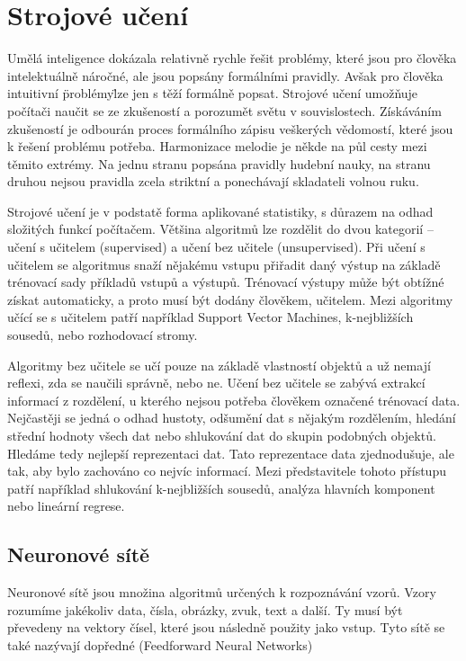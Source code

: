 \chapter{Strojové učení}
Umělá inteligence dokázala relativně rychle řešit problémy, 
které jsou pro člověka intelektuálně náročné, 
ale jsou popsány formálními pravidly.
Avšak pro člověka intuitivní \"problémy\" lze jen s těží formálně popsat.
Strojové učení umožňuje počítači naučit se ze zkušeností
a porozumět světu v souvislostech.
Získáváním zkušeností je odbourán proces formálního zápisu veškerých vědomostí,
které jsou k řešení problému potřeba.\cite{Goodfellow-et-al-2016}
Harmonizace melodie je někde na půl cesty mezi těmito extrémy.
Na jednu stranu popsána pravidly hudební nauky,
na stranu druhou nejsou pravidla zcela striktní 
a ponechávají skladateli volnou ruku.
\par

Strojové učení je v podstatě forma aplikované statistiky,
s důrazem na odhad složitých funkcí počítačem.
Většina algoritmů lze rozdělit do dvou kategorií -- učení s učitelem (supervised) 
a učení bez učitele (unsupervised).
Při učení s učitelem se algoritmus snaží nějakému vstupu přiřadit daný výstup
na základě trénovací sady příkladů vstupů a výstupů.
Trénovací výstupy může být obtížné získat automaticky,
a proto musí být dodány člověkem, učitelem.
Mezi algoritmy učící se s učitelem patří například Support Vector Machines,
k-nejbližších sousedů, nebo rozhodovací stromy.\cite{Goodfellow-et-al-2016}
\par

Algoritmy bez učitele se učí pouze na základě vlastností objektů 
a už nemají reflexi, zda se naučili správně, nebo ne.
Učení bez učitele se zabývá extrakcí informací z rozdělení,
u kterého nejsou potřeba člověkem označené trénovací data.
Nejčastěji se jedná o odhad hustoty, odšumění dat s nějakým rozdělením,
hledání střední hodnoty všech dat nebo shlukování dat do skupin podobných objektů.
Hledáme tedy nejlepší reprezentaci dat.
Tato reprezentace data zjednodušuje, ale tak, aby bylo zachováno co nejvíc informací.
Mezi představitele tohoto přístupu patří například shlukování k-nejbližších sousedů, 
analýza hlavních komponent nebo lineární regrese. 
\cite{Goodfellow-et-al-2016}

\section{Neuronové sítě}
Neuronové sítě jsou množina algoritmů určených k rozpoznávání vzorů.
Vzory rozumíme jakékoliv data, čísla, obrázky, zvuk, text a další.
Ty musí být převedeny na vektory čísel, 
které jsou následně použity jako vstup.
Tyto sítě se také nazývají dopředné (Feedforward Neural Networks)\cite{Nicholson_NeuralNets}
\par

